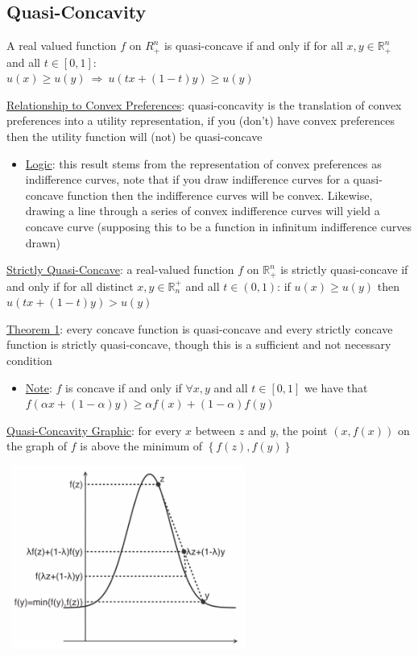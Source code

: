 \documentclass{article}
\begin{document}
\subsection{Quasi-Concavity}
A real valued function $f$ on $R_{+}^{n}$ is quasi-concave if and only if for all $x, y \in \mathbb{R}_{+}^{n}$ and all $t \in [0,1]$: \\ \null\quad $u(x) \geq u(y) \ \Rightarrow \ u(tx + (1-t)y) \geq u(y)$ \par \vspace{0.3em}
  \underline{Relationship to Convex Preferences}: quasi-concavity is the translation of convex preferences into a utility representation, if you (don't) have convex preferences then the utility function will (not) be quasi-concave
  \begin{itemize}
    \item  \underline{Logic}: this result stems from the representation of convex preferences as indifference curves, note that if you draw indifference curves for a quasi-concave function then the indifference curves will be convex. Likewise, drawing a line through a series of convex indifference curves will yield a concave curve (supposing this to be a function in infinitum indifference curves drawn)
  \end{itemize}
  \par
  \underline{Strictly Quasi-Concave}: a real-valued function $f$ on $\mathbb{R}_{+}^{n}$ is strictly quasi-concave if and only if for all distinct $x, y \in \mathbb{R}^{+}_{n}$ and all $t \in (0,1)$: if $u(x) \geq u(y)$ then $u(tx + (1-t)y) > u(y)$
  \par
  \underline{Theorem 1}: every concave function is quasi-concave and every strictly concave function is strictly quasi-concave, though this is a sufficient and not necessary condition
  \begin{itemize}
    \item  \underline{Note}: $f$ is concave if and only if $\forall x,y$ and all $t \in [0,1]$ we have that $f(\alpha x + (1-\alpha)y) \geq \alpha f(x) + (1-\alpha)f(y)$
  \end{itemize}
  \par
  \underline{Quasi-Concavity Graphic}: for every $x$ between $z$ and $y$, the point $(x, f(x))$ on the graph of $f$ is above the minimum of $\left\{ f(z), f(y) \right\}$
  \begin{center}
    \includegraphics[width=8cm, height=6cm]{pic30}
  \end{center}
\end{document}
